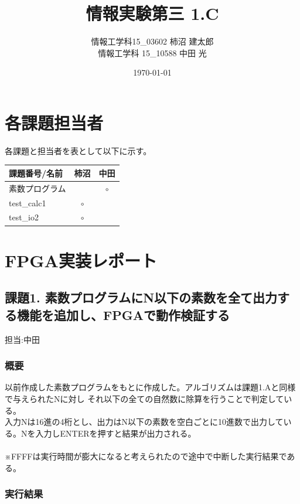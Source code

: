 \documentclass{jsarticle}
\title{情報実験第三 1.C}
\author{情報工学科15\_03602 柿沼 建太郎 \\ 情報工学科 15\_10588 中田 光}
\date{\today}
\begin{document}
\maketitle

\section*{各課題担当者}
各課題と担当者を表として以下に示す。
\begin{table}[h]
\begin{tabular}{|l|c|c|} \hline
課題番号/名前 & 柿沼 & 中田 \\ \hline \hline
素数プログラム &  & $\circ$ \\ \hline
test\_calc1 & $\circ$ & \\ \hline
test\_io2 & $\circ$ & $$ \\ \hline
\end{tabular}
\end{table}

\newpage

\section*{FPGA実装レポート}

\subsection*{課題1. 素数プログラムにN以下の素数を全て出力する機能を追加し、FPGAで動作検証する}
担当:中田\\

\subsubsection*{概要}
以前作成した素数プログラムをもとに作成した。アルゴリズムは課題1.Aと同様で与えられたNに対し
それ以下の全ての自然数に除算を行うことで判定している。\\
入力Nは16進の4桁とし、出力はN以下の素数を空白ごとに10進数で出力している。Nを入力しENTERを押すと結果が出力される。\\
\\
※FFFFは実行時間が膨大になると考えられたので途中で中断した実行結果である。


\subsubsection*{実行結果}
\end{document}
